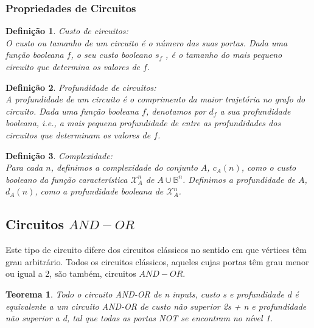 \documentclass[10pt,a4paper]{report}
\newtheorem{definition}{Definição}
\newtheorem{theorem}{Teorema}
\begin{document}
\subsubsection{Propriedades de Circuitos}
\begin{definition} Custo de circuitos:\\
O custo ou tamanho de um circuito é o número das suas portas. Dada uma função booleana $f$, o seu custo booleano $s_f$ , é o tamanho do mais pequeno circuito que determina os valores de $f$.
\end{definition}
\begin{definition} Profundidade de circuitos:\\
A profundidade de um circuito é o comprimento da maior trajetória no grafo do circuito. Dada uma função booleana $f$, denotamos por $d_f$ a sua profundidade booleana, i.e., a mais pequena profundidade de entre as profundidades dos circuitos que determinam os valores de $f$.
\end{definition}
\begin{definition} Complexidade:\\
Para cada $n$, definimos a complexidade do conjunto $A$, $c_A(n)$, como o custo booleano da função característica $\mathcal{X}^n_A$ de $A \cup \mathbb{B}^n$. Definimos a profundidade de $A$, $d_A(n)$, como a profundidade booleana de $\mathcal{X}^n_A$.
\end{definition}
\subsection{Circuitos $AND-OR$}
Este tipo de circuito difere dos circuitos clássicos no sentido em que vértices têm grau arbitrário. Todos os circuitos clássicos, aqueles cujas portas têm grau menor ou igual a 2, são também, circuitos $AND-OR$.
\begin{theorem}
Todo o circuito AND-OR de n inputs, custo s e profundidade d é equivalente a um circuito AND-OR de custo não superior 2s + n e profundidade não superior a d, tal que todas as portas NOT se encontram no nível 1.
\end{theorem}
\end{document}
